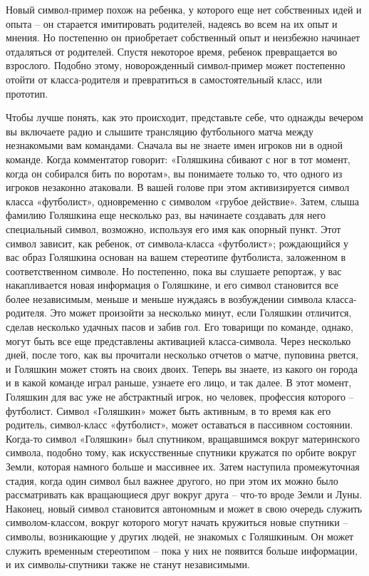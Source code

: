 \documentclass[../main.tex]{subfiles}
\begin{document}
Новый символ-пример похож на ребенка, у которого еще нет собственных идей и опыта \--- он старается имитировать родителей, надеясь во всем на их опыт и мнения. Но постепенно он приобретает собственный опыт и неизбежно начинает отдаляться от родителей. Спустя некоторое время, ребенок превращается во взрослого. Подобно этому, новорожденный символ-пример может постепенно отойти от класса-родителя и превратиться в самостоятельный класс, или прототип.

Чтобы лучше понять, как это происходит, представьте себе, что однажды вечером вы включаете радио и слышите трансляцию футбольного матча между незнакомыми вам командами. Сначала вы не знаете имен игроков ни в одной команде. Когда комментатор говорит: «Голяшкина сбивают с ног в тот момент, когда он собирался бить по воротам», вы понимаете только то, что одного из игроков незаконно атаковали. В вашей голове при этом активизируется символ класса «футболист», одновременно с символом «грубое действие». Затем, слыша фамилию Голяшкина еще несколько раз, вы начинаете создавать для него специальный символ, возможно, используя его имя как опорный пункт. Этот символ зависит, как ребенок, от символа-класса «футболист»; рождающийся у вас образ Голяшкина основан на вашем стереотипе футболиста, заложенном в соответственном символе. Но постепенно, пока вы слушаете репортаж, у вас накапливается новая информация о Голяшкине, и его символ становится все более независимым, меньше и меньше нуждаясь в возбуждении символа класса-родителя. Это может произойти за несколько минут, если Голяшкин отличится, сделав несколько удачных пасов и забив гол. Его товарищи по команде, однако, могут быть все еще представлены активацией класса-символа. Через несколько дней, после того, как вы прочитали несколько отчетов о матче, пуповина рвется, и Голяшкин может стоять на своих двоих. Теперь вы знаете, из какого он города и в какой команде играл раньше, узнаете его лицо, и так далее. В этот момент, Голяшкин для вас уже не абстрактный игрок, но человек, профессия которого \--- футболист. Символ «Голяшкин» может быть активным, в то время как его родитель, символ-класс «футболист», может оставаться в пассивном состоянии. Когда-то символ «Голяшкин» был спутником, вращавшимся вокруг материнского символа, подобно тому, как искусственные спутники кружатся по орбите вокруг Земли, которая намного больше и массивнее их. Затем наступила промежуточная стадия, когда один символ был важнее другого, но при этом их можно было рассматривать как вращающиеся друг вокруг друга \--- что-то вроде Земли и Луны. Наконец, новый символ становится автономным и может в свою очередь служить символом-классом, вокруг которого могут начать кружиться новые спутники \--- символы, возникающие у других людей, не знакомых с Голяшкиным. Он может служить временным стереотипом \--- пока у них не появится больше информации, и их символы-спутники также не станут независимыми.
\end{document}
